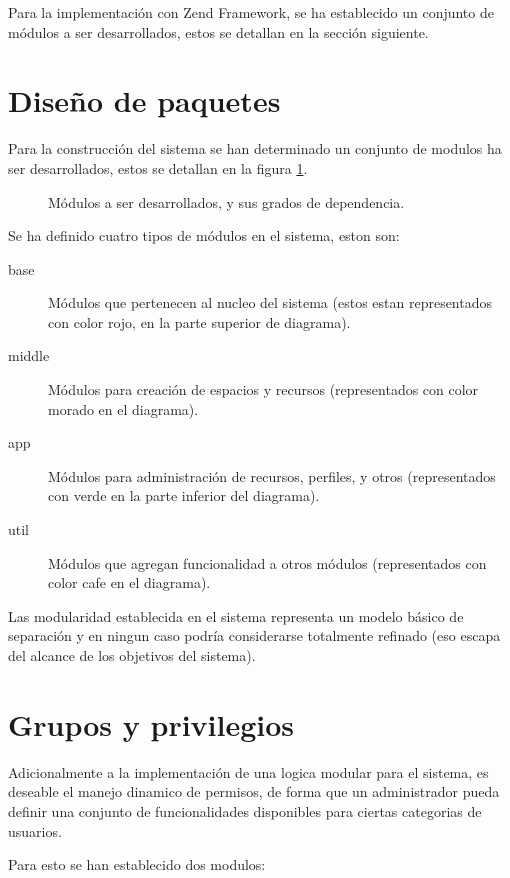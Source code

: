 Para la implementación con Zend Framework, se ha establecido un conjunto de
módulos a ser desarrollados, estos se detallan en la sección siguiente.

\section{Diseño de paquetes}

Para la construcción del sistema se han determinado un conjunto de modulos ha
ser desarrollados, estos se detallan en la figura \ref{paquetes}.

\begin{figure}
\centering

\caption{Módulos a ser desarrollados, y sus grados de dependencia.}
\label{paquetes}
\end{figure}

Se ha definido cuatro tipos de módulos en el sistema, eston son:

\begin{description}
\item [base] Módulos que pertenecen al nucleo del sistema (estos estan
representados con color rojo, en la parte superior de diagrama).
\item [middle] Módulos para creación de espacios y recursos (representados con
color morado en el diagrama).
\item [app] Módulos para administración de recursos, perfiles, y otros
(representados con verde en la parte inferior del diagrama).
\item [util] Módulos que agregan funcionalidad a otros módulos (representados
con color cafe en el diagrama).
\end{description}

Las modularidad establecida en el sistema representa un modelo básico de
separación y en ningun caso podría considerarse totalmente refinado (eso escapa
del alcance de los objetivos del sistema).

\section{Grupos y privilegios}

Adicionalmente a la implementación de una logica modular para el sistema, es
deseable el manejo dinamico de permisos, de forma que un administrador pueda
definir una conjunto de funcionalidades disponibles para ciertas categorias de
usuarios.

Para esto se han establecido dos modulos:

